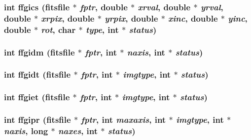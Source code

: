 \subsubsection{\setlength{\rightskip}{0pt plus 5cm}int ffgics (\bf{fitsfile} $\ast$ {\em fptr}, double $\ast$ {\em xrval}, double $\ast$ {\em yrval}, double $\ast$ {\em xrpix}, double $\ast$ {\em yrpix}, double $\ast$ {\em xinc}, double $\ast$ {\em yinc}, double $\ast$ {\em rot}, char $\ast$ {\em type}, int $\ast$ {\em status})}\label{fitsio__64_8h_e41ae6ec4d4f1df61ce26ecc9d558fcb}


\subsubsection{\setlength{\rightskip}{0pt plus 5cm}int ffgidm (\bf{fitsfile} $\ast$ {\em fptr}, int $\ast$ {\em naxis}, int $\ast$ {\em status})}\label{fitsio__64_8h_2faefcdb1176d17c8159464da5f4fe3f}


\subsubsection{\setlength{\rightskip}{0pt plus 5cm}int ffgidt (\bf{fitsfile} $\ast$ {\em fptr}, int $\ast$ {\em imgtype}, int $\ast$ {\em status})}\label{fitsio__64_8h_3a8c6b776e15fb6a1ced2ac459366825}


\subsubsection{\setlength{\rightskip}{0pt plus 5cm}int ffgiet (\bf{fitsfile} $\ast$ {\em fptr}, int $\ast$ {\em imgtype}, int $\ast$ {\em status})}\label{fitsio__64_8h_d26898d66d9521c703b32f967a7ec68c}


\subsubsection{\setlength{\rightskip}{0pt plus 5cm}int ffgipr (\bf{fitsfile} $\ast$ {\em fptr}, int {\em maxaxis}, int $\ast$ {\em imgtype}, int $\ast$ {\em naxis}, long $\ast$ {\em naxes}, int $\ast$ {\em status})}\label{fitsio__64_8h_36cf874c199041ee45957859c011adc4}



